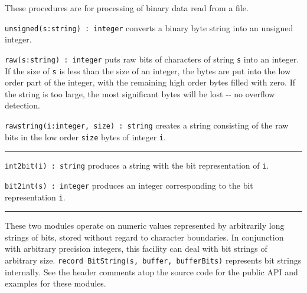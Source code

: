 These procedures are for processing of binary data
read from a file.

\texttt{unsigned(s:string) : integer} converts a binary byte string into
an unsigned integer.

\texttt{raw(s:string) : integer} puts raw bits of characters of string
\texttt{s} into an integer. If the size of \texttt{s} is less than the
size of an integer, the bytes are put into the low order part of the
integer, with the remaining high order bytes filled with zero. If the
string is too large, the most significant bytes will be lost -{}- no
overflow detection.

\texttt{rawstring(i:integer, size) : string} creates a string consisting
of the raw bits in the low order \texttt{size} bytes of integer
\texttt{i}.

\vspace{0.25cm}\hrule{}

\texttt{int2bit(i) : string} produces a string with the bit
representation of \texttt{i}.

\texttt{bit2int(s) : integer} produces an integer corresponding to the
bit representation \texttt{i}. 

\vspace{0.25cm}\hrule{}

These two modules operate on numeric values represented by
arbitrarily long strings of bits, stored without regard to character
boundaries. In conjunction with arbitrary precision integers, this
facility can deal with bit strings of arbitrary size.
\texttt{record BitString(s, buffer, bufferBits)} represents bit
strings internally.
See the header comments atop the source code for the public API and examples
for these modules.



